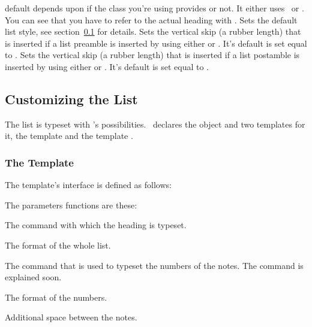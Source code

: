 \documentclass[load-preamble+]{cnltx-doc}
\begin{document}
\begin{options}
    default depends upon if the class you're using provides  or
    not.  It either uses \sarg\ or \sarg. You can
    see that you have to refer to the actual heading with .
    Sets the default list style, see section~\ref{sec:customizing_the_list}
    for details.
    Sets the vertical skip (a rubber length) that is
    inserted if a list preamble is inserted by using either
     or .  It's default is set
    equal to .
    Sets the vertical skip (a rubber length) that is
    inserted if a list postamble is inserted by using either
     or .  It's default
    is set equal to .
\end{options}

\subsection{Customizing the List}\label{sec:customizing_the_list}
The list is typeset with 's possibilities.  \enotez\ declares
the object  and two templates for it, the template
 and the template .

\subsubsection{The  Template}
The  template's interface is defined as follows:
The parameters functions are these:
\begin{description}[style=nextline]
  \item[\code{heading}] The command with which the heading is typeset.
  \item[\code{format}] The format of the whole list.
  \item[\code{number}] The command that is used to typeset the numbers of the
    notes.  The command  is explained soon.
  \item[\code{numbers-format}] The format of the numbers.
  \item[\code{notes-sep}] Additional space between the notes.
\end{description}
\end{document}
